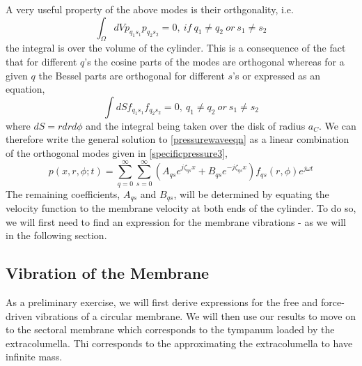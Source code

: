 A very useful property of the above modes is their orthgonality, i.e.
\begin{equation}\label{pressureorthogonality}
 \int_\Omega dVp_{q_1s_1}p_{q_2s_2}=0,\ if\ q_1\neq q_2\ or\ s_1\neq s_2
\end{equation}
the integral is over the volume	 of the cylinder. This is a consequence of the fact that for different $q$'s
the cosine parts of the modes are orthogonal whereas for a given $q$ the Bessel parts are orthogonal for
different $s$'s or expressed as an equation,
\begin{equation}\label{besselorthogonality}
 \int dS f_{q_1s_1}f_{q_2s_2}=0,\ q_1\neq q_2\ or\ s_1\neq s_2
\end{equation}
where $dS=rdrd\phi$ and the integral being taken over the disk of radius $a_C$.
We can therefore write the general solution to \eqref{pressurewaveeqn} as a linear combination of the orthogonal modes given in \eqref{specificpressure3},
\begin{equation}\label{pressuregeneral1}
 p(x,r,\phi;t)=\displaystyle\sum^\infty_{q=0}\displaystyle\sum^\infty_{s=0}\left(A_{qs}e^{j\zeta_{qs}x}+B_{qs}e^{-j\zeta_{qs}x}\right)f_{qs}(r,\phi)e^{j\omega t}
\end{equation}
The remaining coefficients, $A_{qs}$ and $B_{qs}$, will be determined by equating the velocity function to
the membrane velocity at both ends of the cylinder. To do so, we will first need to find an expression
for the membrane vibrations - as we will in the following section.

\subsection{Vibration of the Membrane}\label{membranevibrations}
As a preliminary exercise, we will first derive expressions for the free and force-driven
vibrations of a circular membrane. We will then use our results to move on to the sectoral membrane 
which corresponds to the tympanum loaded by the extracolumella. Thi corresponds to the approximating
the extracolumella to have infinite mass. 
